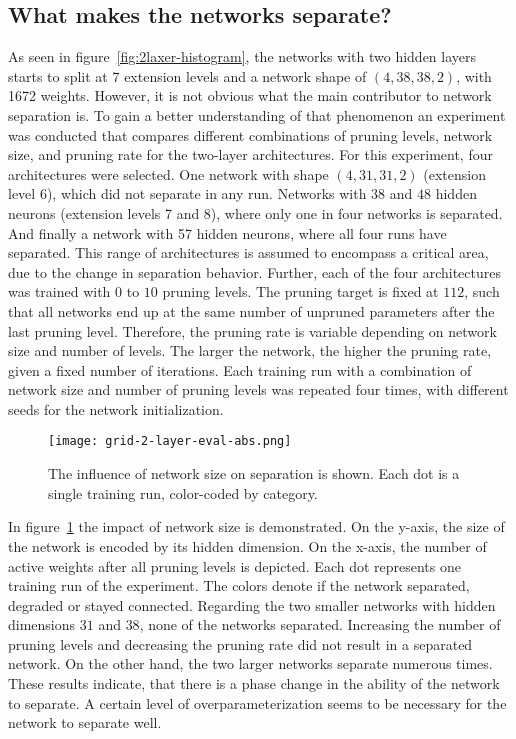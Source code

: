 \subsection{What makes the networks separate?}
As seen in figure~\ref{fig:2laxer-histogram}, the networks with two hidden layers starts to split at 7 extension levels and a network shape of $(4,38,38,2)$, with 1672 weights.
However, it is not obvious what the main contributor to network separation is.
To gain a better understanding of that phenomenon an experiment was conducted that compares different combinations of pruning levels, network size, and pruning rate for the two-layer architectures.
For this experiment, four architectures were selected.
One network with shape $(4,31,31,2)$ (extension level 6), which did not separate in any run.
Networks with $38$ and $48$ hidden neurons (extension levels 7 and 8), where only one in four networks is separated.
And finally a network with 57 hidden neurons, where all four runs have separated.
This range of architectures is assumed to encompass a critical area, due to the change in separation behavior.
Further, each of the four architectures was trained with $0$ to $10$ pruning levels.
The pruning target is fixed at $112$, such that all networks end up at the same number of unpruned parameters after the last pruning level.
Therefore, the pruning rate is variable depending on network size and number of levels.
The larger the network, the higher the pruning rate, given a fixed number of iterations.
Each training run with a combination of network size and number of pruning levels was repeated four times, with different seeds for the network initialization.

\begin{figure}[ht] %
    \centering
    \texttt{[image: grid-2-layer-eval-abs.png]}
    \caption[Influence of network size on separation]{
        The influence of network size on separation is shown.
        Each dot is a single training run, color-coded by category.
        }\label{fig:grid-1}
\end{figure}

In figure~\ref{fig:grid-1} the impact of network size is demonstrated.
On the y-axis, the size of the network is encoded by its hidden dimension.
On the x-axis, the number of active weights after all pruning levels is depicted.
Each dot represents one training run of the experiment.
The colors denote if the network separated, degraded or stayed connected.
Regarding the two smaller networks with hidden dimensions $31$ and $38$, none of the networks separated. 
Increasing the number of pruning levels and decreasing the pruning rate did not result in a separated network.
On the other hand, the two larger networks separate numerous times.
These results indicate, that there is a phase change in the ability of the network to separate.
A certain level of overparameterization seems to be necessary for the network to separate well.


